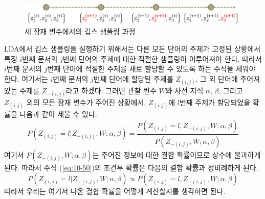 \documentclass[a4paper]{oblivoir}
\begin{document}
\begin{figure}[ht] \centering 
\includegraphics[scale=0.5]{fig10_13.png} 
\caption{세 잠재 변수에서의 깁스 샘플링 과정}
\label{fig:10-23}
\end{figure}

LDA에서 깁스 샘플링을 실행하기 위해서는 다른 모든 단어의 주제가 고정된 상황에서 특정 $i$번째 문서의 $j$번째 단어의 주제에 대한 적절한 샘플링이 이루어져야 한다. 따라서 $i$번째 문서의 $j$번째 단어에 적절한 주제를 새로 할당할 수 있도록 하는 수식을 세워야 한다. 여기서는 $i$번째 문서의 $j$번째 단어에 할당된 주제를 $Z_{(i,j)}$, 그 외 단어에 주어져 있는 주제를 $Z_{-(i,j)}$라고 하겠다. 그러면 관찰 변수 $W$와 사전 지식 $\alpha$, $\beta$, 그리고 $Z_{(i,j)}$ 외의 모든 잠재 변수가 주어진 상황에서, $Z_{(i,j)}$에 $l$번째 주제가 할당되었을 확률을 다음과 같이 세울 수 있다.
\begin{equation}
P(Z_{(i,j)} = l|Z_{-(i,j)}, W ; \alpha,\beta) = \frac{P(Z_{(i,j)} = l, Z_{-(i,j)}, W ; \alpha,\beta)}{P(Z_{-(i,j)}, W ; \alpha,\beta)}
\label{eq:10-50}
\end{equation}
여기서 $P(Z_{-(i,j)}, W ; \alpha,\beta)$는 주어진 정보에 대한 결합 확률이므로 상수에 불과하게 된다. 따라서 수식 (\ref{eq:10-50})의 조건부 확률은 다음의 결합 확률과 정비례하게 된다.
\begin{equation}
P(Z_{(i,j)} = l|Z_{-(i,j)}, W ; \alpha,\beta) \propto P(Z_{(i,j)} = l, Z_{-(i,j)}, W ; \alpha,\beta)
\label{eq:10-51}
\end{equation} 
따라서 우리는 여기서 나온 결합 확률을 어떻게 계산할지를 생각하면 된다. \\
\end{document}
